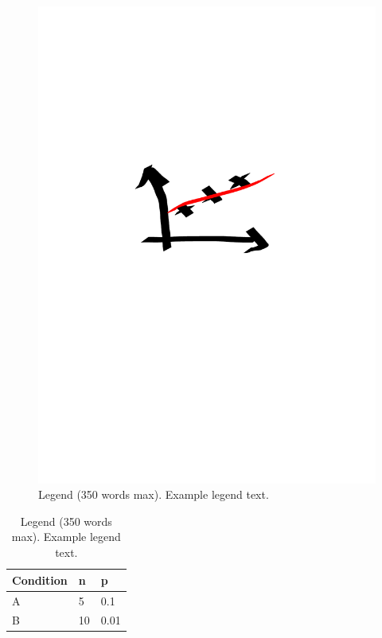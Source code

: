 \documentclass[fleqn,10pt]{wlscirep}
\begin{document}
\begin{figure}[ht]
\centering
\includegraphics[width=0.75\linewidth]{Figure1.pdf}
\caption{Legend (350 words max). Example legend text.}
\label{fig:figure1}
\end{figure}

\begin{table}[ht]
\centering
\begin{tabular}{lll}
\hline
Condition & n & p \\
\hline
A & 5 & 0.1 \\
B & 10 & 0.01 \\
\hline
\end{tabular}
\caption{\label{tab:example}Legend (350 words max). Example legend text.}
\end{table}
\end{document}
